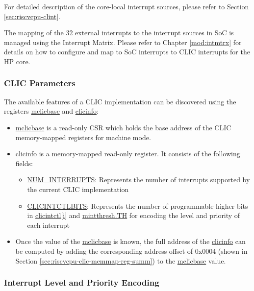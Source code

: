\documentclass[main\_\_EN.tex]{subfiles}
\begin{document}
For detailed description of the core-local interrupt sources, please refer to Section \ref{sec:riscvcpu-clint}.

The mapping of the 32 external interrupts to the interrupt sources in SoC is managed using the Interrupt Matrix. Please refer to Chapter \ref{mod:intmtrx} \textit{} for details on how to configure and map to SoC interrupts to CLIC interrupts for the HP core.

\hypertarget{riscvcpu-clic-params}{}
\subsubsection{CLIC Parameters}
\label{sec:riscvcpu-clic-params}

The available features of a CLIC implementation can be discovered using the registers \hyperref[regdesc:MCLICBASE_REG]{mclicbase}
and \hyperref[regdesc:CLICINFO_REG]{clicinfo}:
\begin{itemize}
    \item \hyperref[regdesc:MCLICBASE_REG]{mclicbase} is a read-only CSR which holds the base address of the CLIC memory-mapped registers for machine mode.
    \item \hyperref[regdesc:CLICINFO_REG]{clicinfo} is a memory-mapped read-only register. It consists of the following fields:
    \begin{itemize}
        \item \hyperref[fielddesc:CLICINFO_NUM_INTERRUPTS]{NUM\_INTERRUPTS}: Represents the number of interrupts supported by the current CLIC implementation
        \item \hyperref[fielddesc:CLICINFO_CLICINTCTLBITS]{CLICINTCTLBITS}: Represents the number of programmable higher bits in \hyperref[regdesc:MCLICINTCTL_REG_i]{clicintctl[i]} and \hyperref[fielddesc:MINTTHRESH_TH]{{mintthresh.TH}} for encoding the level and priority of each interrupt
    \end{itemize}
    \item Once the value of the \hyperref[fielddesc:MCLICBASE]{mclicbase} is known, the full address of the  \hyperref[regdesc:CLICINFO_REG]{clicinfo} can be computed by adding the corresponding address offset of 0x0004 (shown in Section \ref{sec:riscvcpu-clic-memmap-reg-summ}) to the \hyperref[fielddesc:MCLICBASE]{mclicbase} value.
\end{itemize}


\hypertarget{riscvcpu-clic-int-level-prio}{}
\subsubsection{Interrupt Level and Priority Encoding}
\label{sec:riscvcpu-clic-int-level-prio}
\end{document}
